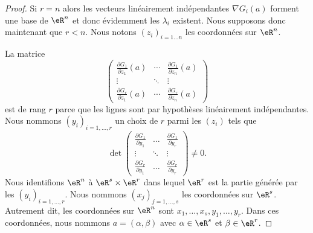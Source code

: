 \begin{proof}
    Si \( r=n\) alors les vecteurs linéairement indépendantes \( \nabla G_i(a) \) forment une base de \( \eR^n\) et donc évidemment les \( \lambda_i\) existent. Nous supposons donc maintenant que \( r<n\). Nous notons \( (z_i)_{i=1\ldots n}\) les coordonnées sur \( \eR^n\).
    
    La matrice
    \begin{equation}
        \begin{pmatrix}
            \frac{ \partial G_1 }{ \partial z_1 }(a)    &   \cdots    &   \frac{ \partial G_1 }{ \partial z_n }(a)    \\
            \vdots    &   \ddots    &   \vdots    \\
            \frac{ \partial G_r }{ \partial z_1 }(a)    &   \cdots    &   \frac{ \partial G_r }{ \partial z_n }(a)
        \end{pmatrix}
    \end{equation}
    est de rang \( r\) parce que les lignes sont par hypothèses linéairement indépendantes. Nous nommons \( (y_i)_{i=1,\ldots, r}\) un choix de \( r\) parmi les \( (z_i)\) tels que
    \begin{equation}
        \det\begin{pmatrix}
            \frac{ \partial G_1 }{ \partial y_1 }    &   \ldots    &   \frac{ \partial G_1 }{ \partial y_r }    \\
            \vdots    &   \ddots    &   \vdots    \\
            \frac{ \partial G_r }{ \partial y_1 }    &   \ldots    &   \frac{ \partial G_r }{ \partial y_r }
        \end{pmatrix}\neq 0.
    \end{equation}
    Nous identifions \( \eR^n\) à \( \eR^s\times \eR^r\) dans lequel \( \eR^r\) est la partie générée par les \( (y_i)_{i=1,\ldots, r}\). Nous nommons \( (x_j)_{j=1,\ldots, s}\) les coordonnées sur \( \eR^s\). Autrement dit, les coordonnées sur \( \eR^n\) sont \( x_1,\ldots, x_s,y_1,\ldots, y_r\). Dans ces coordonnées, nous nommons \( a=(\alpha,\beta)\) avec \( \alpha\in \eR^s\) et \( \beta\in \eR^r\).


\end{proof}
